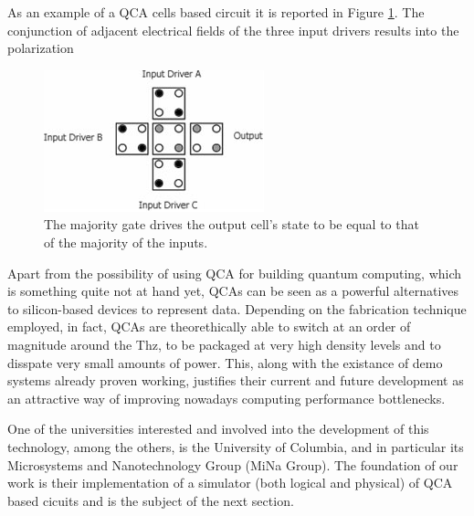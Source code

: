 As an example of a QCA cells based circuit it is reported in Figure \ref{fig:qcamaj}. The conjunction of adjacent electrical fields of the three input drivers results into the polarization

\begin{figure}[h!bt]
	\centerline{\includegraphics{img/qcamaj.png}}
	\caption{The majority gate drives the output cell's state to be equal to that of the majority of the inputs.}
	\label{fig:qcamaj}
\end{figure}

Apart from the possibility of using QCA for building quantum computing, which is something quite not at hand yet, QCAs can be seen as a powerful alternatives to silicon-based devices to represent data. Depending on the fabrication technique employed, in fact, QCAs are theorethically able to switch at an order of magnitude around the Thz, to be packaged at very high density levels and to disspate very small amounts of power. This, along with the existance of demo systems already proven working, justifies their current and future development as an attractive way of improving nowadays computing performance bottlenecks.

One of the universities interested and involved into the development of this technology, among the others, is the University of Columbia, and in particular its Microsystems and Nanotechnology Group (MiNa Group). The foundation of our work is their implementation of a simulator (both logical and physical) of QCA based cicuits and is the subject of the next section.

